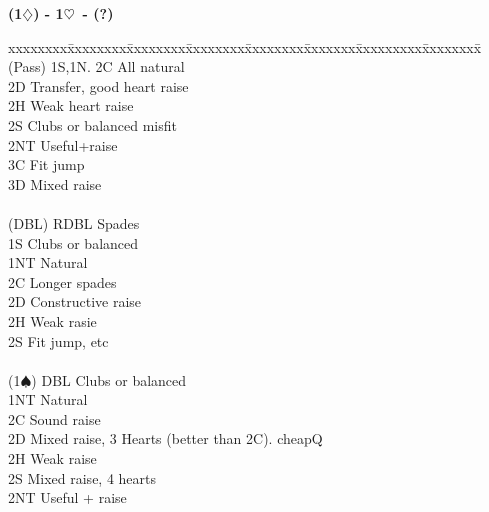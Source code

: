 \documentclass[10pt]{article}
\renewcommand{\d}{$\diamondsuit$}
\newcommand{\h}{$\heartsuit$}
\newcommand{\s}{$\spadesuit$}
\newcommand{\x}{DBL}
\newenvironment{bidtable}[1][]
{\textbf{#1}
  \begin{adjustwidth}{1em}{}
    \addvspace{2pt}
    \begin{tabbing}
      xxxxxxxx\=xxxxxxxx\=xxxxxxxx\=xxxxxxxx\=xxxxxxxx\=xxxxxxx\=xxxxxxxxx\=xxxxxxxx\=\kill}
{\end{tabbing}\end{adjustwidth}\bigskip}%
\begin{document}
\begin{bidtable}[(1\d) - 1\h\ - (?)]
(Pass) \> 1S,1N. \> 2C All natural                                   \\
       \> 2D     \> Transfer, good heart raise                       \\
       \> 2H     \> Weak heart raise                                 \\
       \> 2S     \> Clubs or balanced misfit                         \\
       \> 2NT    \> Useful+raise                                     \\
       \> 3C     \> Fit jump                                         \\
       \> 3D     \> Mixed raise                                      \\
                                                                     \\
(\x)   \> RDBL   \> Spades                                           \\
       \> 1S     \> Clubs or balanced                                \\
       \> 1NT    \> Natural                                          \\
       \> 2C     \> Longer spades                                    \\
       \> 2D     \> Constructive raise                               \\
       \> 2H     \> Weak rasie                                       \\
       \> 2S     \> Fit jump, etc                                    \\
                                                                     \\
(1\s)  \> DBL    \> Clubs or balanced                                \\
       \> 1NT    \> Natural                                          \\
       \> 2C     \> Sound raise                                      \\
       \> 2D     \> Mixed raise, 3  Hearts  (better than 2C). cheapQ \\
       \> 2H     \> Weak raise                                       \\
       \> 2S     \> Mixed raise, 4 hearts                            \\
       \> 2NT    \> Useful + raise                                   \\

\end{bidtable}
\end{document}
